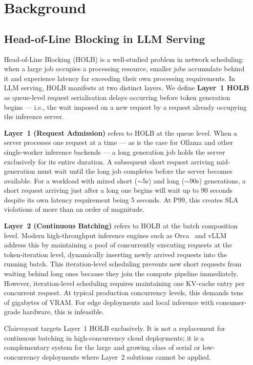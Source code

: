 \documentclass[10pt,letterpaper]{article}
\begin{document}
\section{Background}
\label{sec:background}

\subsection{Head-of-Line Blocking in LLM Serving}

Head-of-Line Blocking (HOLB) is a well-studied problem in network scheduling: when a large job occupies a processing resource, smaller jobs accumulate behind it and experience latency far exceeding their own processing requirements. In LLM serving, HOLB manifests at two distinct layers. We define \textbf{Layer~1 HOLB} as queue-level request serialisation delays occurring before token generation begins --- i.e., the wait imposed on a new request by a request already occupying the inference server.

\textbf{Layer~1 (Request Admission)} refers to HOLB at the queue level. When a server processes one request at a time --- as is the case for Ollama and other single-worker inference backends --- a long generation job holds the server exclusively for its entire duration. A subsequent short request arriving mid-generation must wait until the long job completes before the server becomes available. For a workload with mixed short (${\sim}$5s) and long (${\sim}$90s) generations, a short request arriving just after a long one begins will wait up to 90 seconds despite its own latency requirement being 5 seconds. At P99, this creates SLA violations of more than an order of magnitude.

\textbf{Layer~2 (Continuous Batching)} refers to HOLB at the batch composition level. Modern high-throughput inference engines such as Orca~\cite{yu2022orca} and vLLM~\cite{kwon2023vllm} address this by maintaining a pool of concurrently executing requests at the token-iteration level, dynamically inserting newly arrived requests into the running batch. This iteration-level scheduling prevents new short requests from waiting behind long ones because they join the compute pipeline immediately. However, iteration-level scheduling requires maintaining one KV-cache entry per concurrent request. At typical production concurrency levels, this demands tens of gigabytes of VRAM. For edge deployments and local inference with consumer-grade hardware, this is infeasible.

Clairvoyant targets Layer~1 HOLB exclusively. It is not a replacement for continuous batching in high-concurrency cloud deployments; it is a complementary system for the large and growing class of serial or low-concurrency deployments where Layer~2 solutions cannot be applied.
\end{document}
